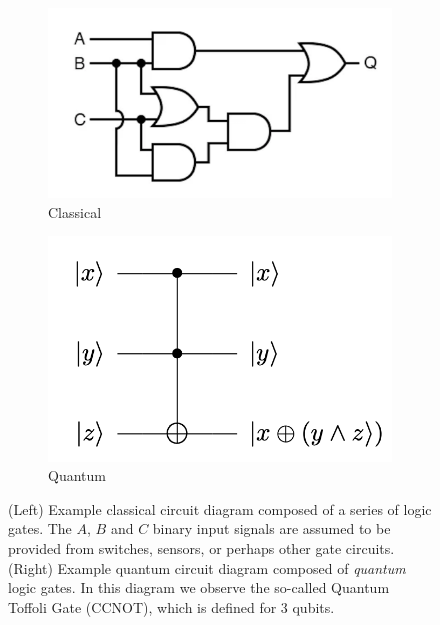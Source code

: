 \documentclass{article}[11pt]
\begin{document}
\begin{figure}[H]
\centering
\begin{subfigure}[t]{0.5\textwidth}
\centering
\includegraphics[width=0.7\linewidth]{Pictures/logicgates.png}
\caption{Classical}
\label{fig:circuitsub1}
\end{subfigure}%
\begin{subfigure}[t]{0.5\textwidth}
\centering
\includegraphics[width=0.7\linewidth]{Pictures/quantumcirc.png}
\caption{Quantum}
\label{fig:circuitsub2}
\end{subfigure}
\caption{(Left) Example classical circuit diagram composed of a series of logic gates. The $A$, $B$ and $C$ binary input signals are assumed to be provided from switches, sensors, or perhaps other gate circuits.\cite{circuitbook}\\(Right) Example quantum circuit diagram composed of \emph{quantum} logic gates. In this diagram we observe the so-called Quantum Toffoli Gate (CCNOT), which is defined for 3 qubits.\cite{exquantumcirc}}
\label{fig:circuit_examples}
\end{figure}
\end{document}
